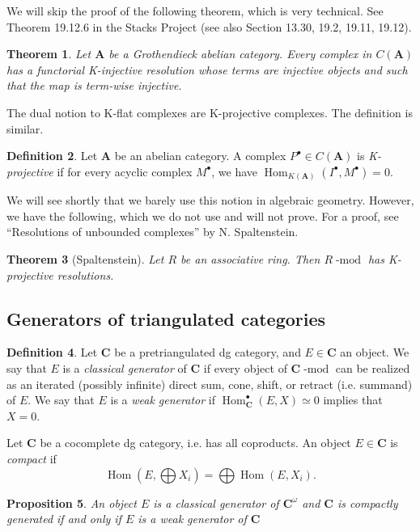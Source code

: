 \documentclass[10pt]{article}
\newtheorem{thm}{Theorem}[section]
\newtheorem{prop}[thm]{Proposition}
\theoremstyle{definition}
\newtheorem{defn}[thm]{Definition}
\DeclareMathOperator{\Hom}{Hom}
\DeclareMathOperator{\dmod}{-mod}
\newcommand{\cat}{\mathbf}
\begin{document}
We will skip the proof of the following theorem, which is very technical.  See Theorem 19.12.6 in the Stacks Project (see also Section 13.30, 19.2, 19.11, 19.12).
\begin{thm}
Let $\cat{A}$ be a Grothendieck abelian category.  Every complex in $C(\cat{A})$ has a functorial K-injective resolution whose terms are injective objects and such that the map is term-wise injective.
\end{thm}


The dual notion to K-flat complexes are K-projective complexes.  The definition is similar.
\begin{defn}
Let $\cat{A}$ be an abelian category.  A complex $P^\bullet \in C(\cat{A})$ is \emph{K-projective} if for every acyclic complex $M^\bullet$, we have $\Hom_{K(\cat{A})}(I^\bullet, M^\bullet) = 0$.
\end{defn}

We will see shortly that we barely use this notion in algebraic geometry.  However, we have the following, which we do not use and will not prove.  For a proof, see ``Resolutions of unbounded complexes'' by N. Spaltenstein.
\begin{thm}[Spaltenstein]
Let $R$ be an associative ring.  Then $R\dmod$ has K-projective resolutions.
\end{thm}


\subsection{Generators of triangulated categories}

\begin{defn}
Let $\cat{C}$ be a pretriangulated dg category, and $E \in \cat{C}$ an object.  We say that $E$ is a \emph{classical generator} of $\cat{C}$ if every object of $\cat{C}\dmod$ can be realized as an iterated (possibly infinite) direct sum, cone, shift, or retract (i.e. summand) of $E$.  We say that $E$ is a \emph{weak generator} if $\Hom^\bullet_{\cat{C}}(E, X) \simeq 0$ implies that $X = 0$.  


Let $\cat{C}$ be a cocomplete dg category, i.e. has all coproducts.  An object $E \in \cat{C}$ is \emph{compact} if
$$\Hom(E, \bigoplus X_i) = \bigoplus \Hom(E, X_i).$$
\end{defn}


\begin{prop}
An object $E$ is a classical generator of $\cat{C}^\omega$ and $\cat{C}$ is compactly generated if and only if $E$ is a weak generator of $\cat{C}$
\end{prop}
\end{document}
